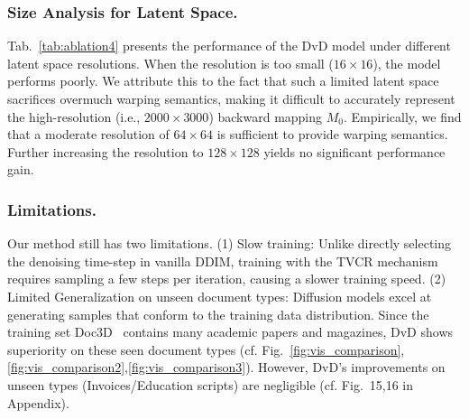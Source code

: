 \subsubsection{Size Analysis for Latent Space.}
Tab.~\ref{tab:ablation4} presents the performance of the DvD model under different latent space resolutions. When the resolution is too small ($16\times16$), the model performs poorly. We attribute this to the fact that such a limited latent space sacrifices overmuch warping semantics, making it difficult to accurately represent the high-resolution (i.e., $2000\times3000$) backward mapping $M_0$. Empirically, we find that a moderate resolution of $64\times64$ is sufficient to provide warping semantics. Further increasing the resolution to $128\times128$ yields no significant performance gain.








\subsubsection{Limitations.} 
Our method still has two limitations. (1) Slow training: Unlike directly selecting the denoising time-step in vanilla DDIM, training with the TVCR mechanism requires sampling a few steps per iteration, causing a slower training speed.
(2) Limited Generalization on unseen document types: Diffusion models excel at generating samples that conform to the training data distribution. Since the training set Doc3D~\cite{das2019dewarpnet} contains many academic papers and magazines, DvD shows superiority on these seen document types (cf. Fig.~\ref{fig:vis_comparison},\ref{fig:vis_comparison2},\ref{fig:vis_comparison3}). However, DvD's improvements on unseen types (Invoices/Education scripts) are negligible (cf. Fig.~15,16 in Appendix).




